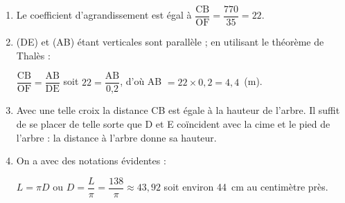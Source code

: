 
\medskip 

%
% 
%
%
%
%

\begin{enumerate}
\item %
Le coefficient d'agrandissement est égal à $\dfrac{\text{CB}}{\text{OF}} =  \dfrac{770}{35} = 22$.
\item %
(DE) et (AB) étant verticales sont parallèle ; en utilisant le théorème de Thalès :

$\dfrac{\text{CB}}{\text{OF}} = \dfrac{\text{AB}}{\text{DE}} $ soit $22 = \dfrac{\text{AB}}{\text{0,2}}$, d'où AB $ = 22 \times 0,2 = 4,4$~(m).
\item %
Avec une telle croix la distance CB est égale à la hauteur de l'arbre. Il suffit de se placer de telle sorte que D et E coïncident avec la cime et le pied de l'arbre : la distance à l'arbre donne sa hauteur. 
\item %

On a avec des notations évidentes : 

$L = \pi D$ ou $D  = \dfrac{L}{\pi} = \dfrac{138}{\pi} \approx43,92$ soit environ 44~cm au centimètre près. 
\end{enumerate} 

\vspace{0,5cm}

